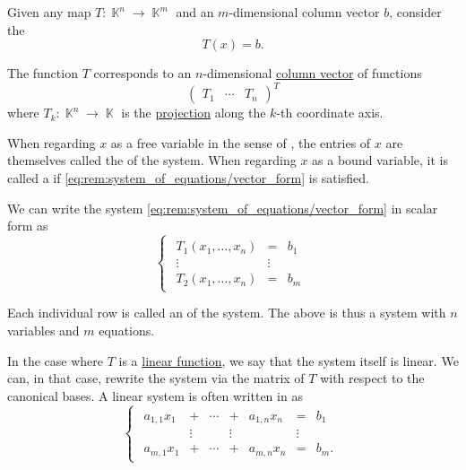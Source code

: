 \begin{remark}\label{rem:system_of_equations}
  Given any map \( T: \BbbK^n \to \BbbK^m \) and an \( m \)-dimensional column vector \( b \), consider the 
  \begin{equation}\label{eq:rem:system_of_equations/vector_form}
    T(x) = b.
  \end{equation}

  The function \( T \) corresponds to an \( n \)-dimensional \hyperref[def:array/column_vector]{column vector} of functions
  \begin{equation*}
    \begin{pmatrix}
      T_1 & \cdots & T_n
    \end{pmatrix}^T
  \end{equation*}
  where \( T_k: \BbbK^n \to \BbbK \) is the \hyperref[def:basis_decomposition]{projection} along the \( k \)-th coordinate axis.

  When regarding \( x \) as a free variable in the sense of , the entries of \( x \) are themselves called the  of the system. When regarding \( x \) as a bound variable, it is called a  if \eqref{eq:rem:system_of_equations/vector_form} is satisfied.

  We can write the system \eqref{eq:rem:system_of_equations/vector_form} in scalar form as
  \begin{equation}\label{eq:rem:system_of_equations/nonlinear_scalar_form}
    \begin{cases}
      \begin{array}{ccc}
        T_1(x_1, \ldots, x_n) & =      & b_1    \\
        \vdots                & \vdots &        \\
        T_2(x_1, \ldots, x_n) & =      & b_m
      \end{array}
    \end{cases}
  \end{equation}

  Each individual row is called an  of the system. The above is thus a system with \( n \) variables and \( m \) equations.

  In the case where \( T \) is a \hyperref[def:semimodule/homomorphism]{linear function}, we say that the system itself is linear. We can, in that case, rewrite the system via the matrix of \( T \) with respect to the canonical bases. A linear system is often written in  as
  \begin{equation}\label{eq:rem:system_of_equations/scalar_form}
    \begin{cases}
      \begin{array}{ccccccc}
        a_{1,1} x_1 & +      & \cdots & +      & a_{1,n} x_n & =      & b_1 \\
                    & \vdots &        & \vdots &             & \vdots &     \\
        a_{m,1} x_1 & +      & \cdots & +      & a_{m,n} x_n & =      & b_m.
      \end{array}
    \end{cases}
  \end{equation}


\end{remark}
